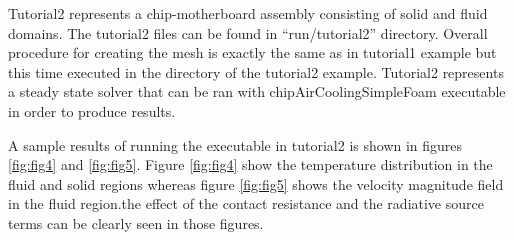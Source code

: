 \begin{figure*}[htbp]
\begin{center}
\caption{Initial temperature distribution}
\label{fig:fig1}
\end{center}
\end{figure*}

\begin{figure*}[htbp]
\begin{center}
\caption{Final temperature distribution}
\label{fig:fig2}
\end{center}
\end{figure*}

\begin{figure*}[htbp]
\begin{center}
\caption{velocity magnitude distribution}
\label{fig:fig3}
\end{center}
\end{figure*}


Tutorial2 represents a chip-motherboard assembly consisting of solid
and fluid domains. The tutorial2 files can be found in
``run/tutorial2'' directory. Overall procedure for
creating the mesh is exactly the same as in tutorial1 example but this
time executed in the directory of the tutorial2 example. Tutorial2
represents a steady state solver that can be ran with
chipAirCoolingSimpleFoam executable in order to produce results.

A sample results of running the executable in tutorial2 is shown in
figures \ref{fig:fig4} and \ref{fig:fig5}. Figure \ref{fig:fig4} show
the temperature distribution in the fluid and solid regions whereas
figure \ref{fig:fig5} shows the velocity magnitude field in the fluid
region.the effect of the contact resistance and the radiative source
terms can be clearly seen in those figures.

\begin{figure*}[htbp]
\begin{center}
\caption{Temperature distribution}
\label{fig:fig4}
\end{center}
\end{figure*}

\begin{figure*}[htbp]
\begin{center}
\caption{velocity magnitude distribution}
\label{fig:fig5}
\end{center}
\end{figure*}


